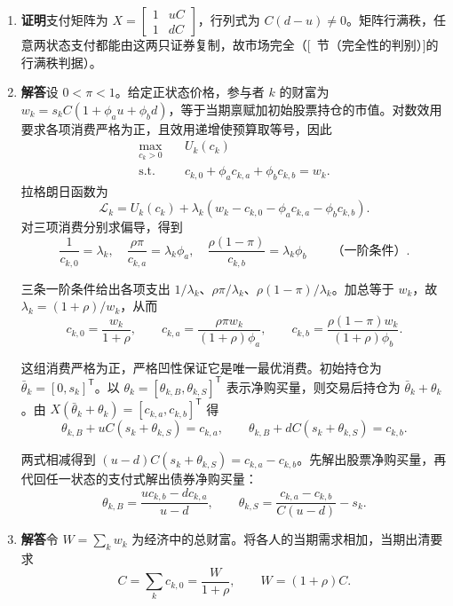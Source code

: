 \begin{solution}[blank-type=manual,blank-vsep=10\baselineskip]
\begin{enumerate}[label=(\alph*)]
 \item\label{exer:wj-ten-3-answer-a} \textbf{证明}\quad 支付矩阵为 $X=\begin{bmatrix}1&uC\\1&dC\end{bmatrix}$，行列式为 $C(d-u)\ne0$。矩阵行满秩，任意两状态支付都能由这两只证券复制，故市场完全\ifdefined\WJHandoutKnowledge（[~节（完全性的判别）]的行满秩判据）\fi。

 \item \textbf{解答}\quad 设 $0<\pi<1$。给定正状态价格，参与者 $k$ 的财富为 $w_k=s_kC(1+\phi_au+\phi_bd)$，等于当期禀赋加初始股票持仓的市值。对数效用要求各项消费严格为正，且效用递增使预算取等号，因此
 \[
 \begin{aligned}
 \max_{c_k>0}\quad &U_k(c_k)\\
 \text{s.t.}\quad &c_{k,0}+\phi_ac_{k,a}+\phi_bc_{k,b}=w_k .
 \end{aligned}
 \]
 拉格朗日函数为
 \[
 \mathcal L_k=U_k(c_k)+\lambda_k(w_k-c_{k,0}-\phi_ac_{k,a}-\phi_bc_{k,b}).
 \]
 对三项消费分别求偏导，得到
 \[
 \frac1{c_{k,0}}=\lambda_k,\quad
 \frac{\rho\pi}{c_{k,a}}=\lambda_k\phi_a,\quad
 \frac{\rho(1-\pi)}{c_{k,b}}=\lambda_k\phi_b
 \qquad\text{（一阶条件）}.
 \]

 三条一阶条件给出各项支出 $1/\lambda_k$、$\rho\pi/\lambda_k$、$\rho(1-\pi)/\lambda_k$。加总等于 $w_k$，故 $\lambda_k=(1+\rho)/w_k$，从而
 \[
 c_{k,0}=\frac{w_k}{1+\rho},\qquad
 c_{k,a}=\frac{\rho\pi w_k}{(1+\rho)\phi_a},\qquad
 c_{k,b}=\frac{\rho(1-\pi)w_k}{(1+\rho)\phi_b}.
 \]

 这组消费严格为正，严格凹性保证它是唯一最优消费。初始持仓为 $\bar\theta_k=[0,s_k]^{\mathsf T}$。以 $\theta_k=[\theta_{k,B},\theta_{k,S}]^{\mathsf T}$ 表示净购买量，则交易后持仓为 $\bar\theta_k+\theta_k$。由 $X(\bar\theta_k+\theta_k)=[c_{k,a},c_{k,b}]^{\mathsf T}$ 得
 \[
 \theta_{k,B}+uC(s_k+\theta_{k,S})=c_{k,a},\qquad
 \theta_{k,B}+dC(s_k+\theta_{k,S})=c_{k,b}.
 \]

 两式相减得到 $(u-d)C(s_k+\theta_{k,S})=c_{k,a}-c_{k,b}$。先解出股票净购买量，再代回任一状态的支付式解出债券净购买量：
 \[
 \theta_{k,B}=\frac{u c_{k,b}-d c_{k,a}}{u-d},\qquad
 \theta_{k,S}=\frac{c_{k,a}-c_{k,b}}{C(u-d)}-s_k.
 \]

 \item \textbf{解答}\quad 令 $W=\sum_k w_k$ 为经济中的总财富。将各人的当期需求相加，当期出清要求
 \[
 C=\sum_k c_{k,0}=\frac{W}{1+\rho},
 \qquad W=(1+\rho)C.
 \]


\end{enumerate}
\end{solution}
